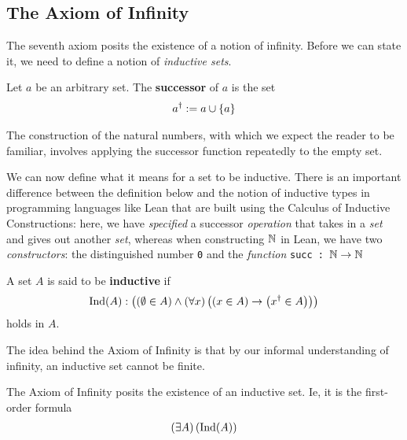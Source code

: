 \begin{baxiom}
    \sorry
\end{baxiom}

\begin{baxiom}
    \sorry
\end{baxiom}

\begin{baxiom}
    \sorry
\end{baxiom}

\sorry


\subsection{The Axiom of Infinity}

The seventh axiom posits the existence of a notion of infinity. Before we can state it, we need to define a notion of \textit{inductive sets}.

\begin{boxdefinition}\label{Ch3:Def:succ_dg}
    Let $a$ be an arbitrary set. The \textbf{successor} of $a$ is the set
    \begin{align*}
        a^{\dagger} := a \cup \left\{ a \right\}
    \end{align*}
\end{boxdefinition}

The construction of the natural numbers, with which we expect the reader to be familiar, involves applying the successor function repeatedly to the empty set.

We can now define what it means for a set to be inductive. There is an important difference between the definition below and the notion of inductive types in programming languages like Lean that are built using the Calculus of Inductive Constructions: here, we have \textit{specified} a successor \textit{operation} that takes in a \textit{set} and gives out another \textit{set}, whereas when constructing $\mathbb{N}$ in Lean, we have two \textit{constructors}: the distinguished number \texttt{0} and the \textit{function} \texttt{succ~:~$\mathbb{N} \to \mathbb{N}$}

\begin{boxdefinition}[Inductivity]
    A set $A$ is said to be \textbf{inductive} if
    \begin{align*}
        \operatorname{Ind}(A) : \left( \left( \emptyset \in A \right) \land \left( \forall x \right)\left( \left( x \in A \right) \to \left( x^{\dagger} \in A \right) \right) \right)
    \end{align*}
    holds in $A$.
\end{boxdefinition}

The idea behind the Axiom of Infinity is that by our informal understanding of infinity, an inductive set cannot be finite.

\begin{baxiom}\label{ZF:Infinity}
    The Axiom of Infinity posits the existence of an inductive set. Ie, it is the first-order formula
    \begin{align*}
        \left( \exists A \right)\left( \operatorname{Ind}(A) \right)
    \end{align*}
\end{baxiom}

